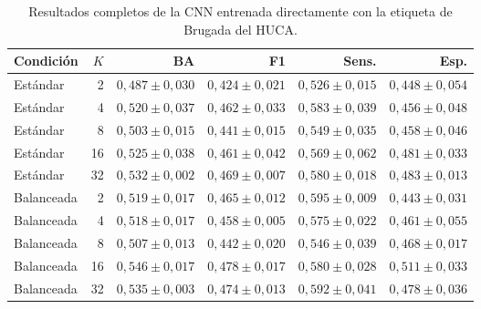\begin{table}[H]
  \centering
  \small
  \begin{tabular}{lrrrrr}
    \toprule
    Condición & \(K\) & BA & F1 & Sens. & Esp. \\
    \midrule
    Estándar & 2 & \(0,487 \pm 0,030\) & \(0,424 \pm 0,021\) & \(0,526 \pm 0,015\) & \(0,448 \pm 0,054\) \\
    Estándar & 4 & \(0,520 \pm 0,037\) & \(0,462 \pm 0,033\) & \(0,583 \pm 0,039\) & \(0,456 \pm 0,048\) \\
    Estándar & 8 & \(0,503 \pm 0,015\) & \(0,441 \pm 0,015\) & \(0,549 \pm 0,035\) & \(0,458 \pm 0,046\) \\
    Estándar & 16 & \(0,525 \pm 0,038\) & \(0,461 \pm 0,042\) & \(0,569 \pm 0,062\) & \(0,481 \pm 0,033\) \\
    Estándar & 32 & \(0,532 \pm 0,002\) & \(0,469 \pm 0,007\) & \(0,580 \pm 0,018\) & \(0,483 \pm 0,013\) \\
    Balanceada & 2 & \(0,519 \pm 0,017\) & \(0,465 \pm 0,012\) & \(0,595 \pm 0,009\) & \(0,443 \pm 0,031\) \\
    Balanceada & 4 & \(0,518 \pm 0,017\) & \(0,458 \pm 0,005\) & \(0,575 \pm 0,022\) & \(0,461 \pm 0,055\) \\
    Balanceada & 8 & \(0,507 \pm 0,013\) & \(0,442 \pm 0,020\) & \(0,546 \pm 0,039\) & \(0,468 \pm 0,017\) \\
    Balanceada & 16 & \(0,546 \pm 0,017\) & \(0,478 \pm 0,017\) & \(0,580 \pm 0,028\) & \(0,511 \pm 0,033\) \\
    Balanceada & 32 & \(0,535 \pm 0,003\) & \(0,474 \pm 0,013\) & \(0,592 \pm 0,041\) & \(0,478 \pm 0,036\) \\
    \bottomrule
  \end{tabular}
  \caption{Resultados completos de la CNN entrenada directamente con la etiqueta de Brugada del HUCA.}
  \label{tab:cnn_clinica_resultados}
  \resultstablenote
\end{table}
